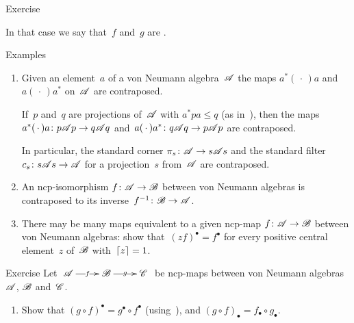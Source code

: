 \documentclass[a]{subfiles}
\begin{document}
\begin{parsec}
\begin{point}{Exercise}
\begin{point}
In that case we say that~$f$ and~$g$ are .
\end{point}
\end{point}
\begin{point}{Examples}%
\begin{enumerate}
\item
Given an element~$a$ of a von Neumann algebra~$\mathscr{A}$
the maps $a^*(\,\cdot\,)a$ and~$a(\,\cdot\,)a^*$
on~$\mathscr{A}$ are contraposed.

If~$p$ and~$q$ are projections of~$\mathscr{A}$
with $a^*pa\leq q$
(as in~),
then the maps
$a^*(\,\cdot\,)a \colon p\mathscr{A} p\to q\mathscr{A} q$
and~$a(\,\cdot\,)a^*\colon q\mathscr{A} q \to p\mathscr{A} p$
are contraposed.

In particular,
the standard corner $\pi_s\colon \mathscr{A}\to s \mathscr{A} s$
and the standard filter $c_s\colon s\mathscr{A} s\to \mathscr{A}$
for a projection~$s$ from~$\mathscr{A}$
are contraposed.
\item
An ncp-isomorphism $f\colon \mathscr{A}\to\mathscr{B}$
between von Neumann algebras
is contraposed to its inverse~$f^{-1}\colon \mathscr{B}\to\mathscr{A}$.
\item
There may be many maps equivalent to a given ncp-map $f\colon \mathscr{A}\to\mathscr{B}$
between von Neumann algebras:
show that~$(zf)^\bullet = f^\bullet$
for every positive central element~$z$ of~$\mathscr{B}$ with~$\left\lceil z\right\rceil=1$.
\end{enumerate}
\end{point}
\begin{point}{Exercise}%
Let $\xymatrix{
	\scrA\ar[r]|-{f}&
	\scrB\ar[r]|-{g}&
\scrC}$
be ncp-maps between von Neumann algebras~$\mathscr{A}$,
$\mathscr{B}$ and~$\mathscr{C}$.
\begin{enumerate}
\item
Show that $(g\circ f)^\bullet = g^\bullet\circ f^\bullet$
(using~),
and $(g\circ f)_\bullet = f_\bullet\circ g_\bullet$.


\end{enumerate}
\end{point}
\end{parsec}
\end{document}
